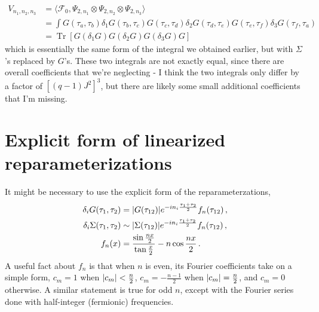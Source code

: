 \documentclass[aps,prx,preprint,onecolumn,citeautoscript,footinbib]{revtex4-1}
\newcommand{\Tr}{\operatorname{Tr}}
\begin{document}
\begin{equation}
    \begin{aligned}
    V_{n_1, n_2, n_3} &= \langle \mathcal{F}_0,  \Psi_{2, n_1} \otimes \Psi_{2, n_2} \otimes \Psi_{2, n_3} \rangle
    \\
    &= \int G(\tau_a, \tau_b) \delta_1 G(\tau_b, \tau_c) G(\tau_c, \tau_d) \delta_2 G(\tau_d, \tau_e) G(\tau_e, \tau_f) \delta_3 G(\tau_f, \tau_a) 
    \\
    &= \Tr\left[G (\delta_1 G) G (\delta_2 G) G (\delta_3 G)G \right]
    \end{aligned}
\end{equation}
which is essentially the same form of the integral we obtained earlier, but with $\Sigma$'s replaced by $G$'s. These two integrals are not exactly equal, since there are overall coefficients that we're neglecting - I think the two integrals only differ by a factor of $\left[(q-1)J^2\right]^3$, but there are likely some small additional coefficients that I'm missing.
\appendix
\section{Explicit form of linearized reparameterizations}
It might be necessary to use the explicit form of the reparameterzations,
\begin{equation}
\begin{aligned}
    \delta_i G(\tau_1, \tau_2) &= \abs{G(\tau_{12})} e^{-in_i \frac{\tau_1 + \tau_2}{2}} f_n(\tau_{12})\,,
    \\
    \delta_i \Sigma(\tau_1, \tau_2) &\sim  \abs{\Sigma(\tau_{12})} e^{-in_i \frac{\tau_1 + \tau_2}{2}} f_n(\tau_{12})\,,
    \\
    f_n(x) &= \frac{\sin\frac{nx}{2}}{\tan \frac{x}{2}} - n \cos \frac{nx}{2}\,.
    \end{aligned}
\end{equation}
A useful fact about $f_n$ is that when $n$ is even, its Fourier coefficients take on a simple form, $c_m = 1$ when $\abs{c_m} < \frac{n}{2}$, $c_m = -\frac{n-1}{2}$ when $\abs{c_m} = \frac{n}{2}$, and $c_m = 0$ otherwise. A similar statement is true for odd $n$, except with the Fourier series done with half-integer (fermionic) frequencies.
\end{document}
